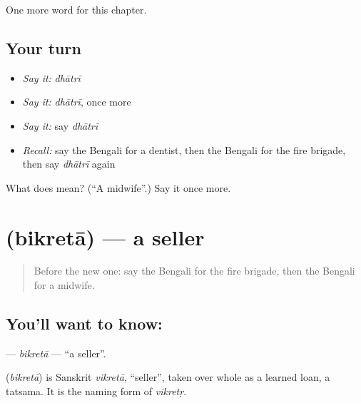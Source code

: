 \begin{grammarlens}[title={What you've built}]
One more word for this chapter.
\end{grammarlens}

\subsection*{Your turn}
\begin{itemize}
\raggedright
  \item \emph{Say it:} \emph{dhātrī}
  \item \emph{Say it:} \emph{dhātrī}, once more
  \item \emph{Say it:} say \emph{dhātrī}
  \item \emph{Recall:} say the Bengali for a dentist, then the Bengali for the fire brigade, then say \emph{dhātrī} again
\end{itemize}

\begin{tcolorbox}[breakable,colback=teal!4,colframe=teal!35!black,title={Before you move on}]
What does  mean? (\textquotedblleft{}A midwife\textquotedblright{}.) Say it once more.
\end{tcolorbox}
\section[\texorpdfstring{\bn{বিক্রেতা} (bikretā)}{বিক্রেতা (bikretā)}]{ (bikretā) — a seller}

\label{lesson:BN-C178-bikreta}



\begin{quote}
Before the new one: say the Bengali for the fire brigade, then the Bengali for a midwife.
\end{quote}

\subsection*{You'll want to know: }
\textbf{} — \emph{bikretā} — \textquotedblleft{}a seller\textquotedblright{}.

\begin{cousinweb}
\textbf{} (\emph{bikretā}) is Sanskrit \emph{vikretā}, \textquotedblleft{}seller\textquotedblright{}, taken over whole as a learned loan, a tatsama. It is the naming form of \emph{vikretṛ}.
\end{cousinweb}

